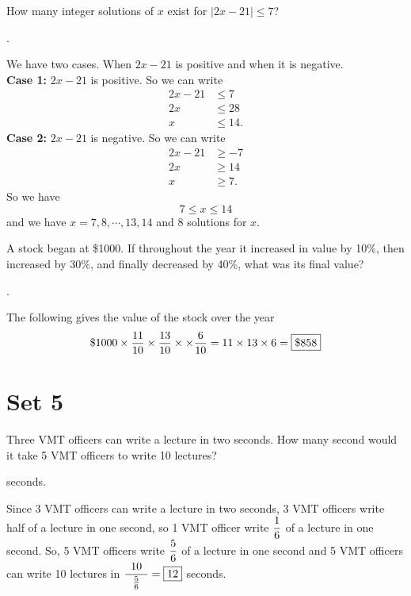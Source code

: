 \documentclass[11pt]{article}
\DeclareRobustCommand{\frac}[3][0pt]{%
  {\begingroup\hspace{#1}#2\hspace{#1}\endgroup\over\hspace{#1}#3\hspace{#1}}}
\begin{document}
\begin{problem}
How many integer solutions of $x$ exist for $\left| 2x-21 \right| \leq 7$?
\end{problem}
\begin{answer}
.
\end{answer}
\begin{solution}
We have two cases. When $2x-21$ is positive and when it is negative. \\
\textbf{Case 1:} $2x-21$ is positive.
So we can write
\begin{align*}
2x-21 &\leq 7 \\
2x &\leq 28 \\
x &\leq 14.
\end{align*}
\textbf{Case 2:} $2x-21$ is negative.
So we can write
\begin{align*}
2x-21 &\geq -7 \\
2x &\geq 14 \\
x &\geq 7.
\end{align*}
So we have
$$7 \leq x \leq 14$$
and we have $x = 7, 8, \cdots, 13, 14$ and $\boxed{8}$ solutions for $x$.
\end{solution}

\begin{problem}
A stock began at \$1000. If throughout the year it increased in value by 10\%, then increased by 30\%,
and finally decreased by 40\%, what was its final value?
\end{problem}
\begin{answer}
. 
\end{answer}
\begin{solution}
The following gives the value of the stock over the year
$$ \$1000 \times \frac{11}{10} \times \frac{13}{10} \times \times \frac{6}{10} = 11 \times 13 \times 6 = \boxed{\$858}$$
\end{solution}

\eject

\section*{Set 5}

\begin{problem}Three VMT officers can write a lecture in two seconds. How many second would it take 5 VMT officers to write 10 lectures?
\end{problem}

\begin{answer}  seconds. \end{answer}
\begin{solution}
Since 3 VMT officers can write a lecture in two seconds, 3 VMT officers write half of a lecture in one second, so 1 VMT officer write $\displaystyle \frac{1}{6}$ of a lecture in one second. So, 5 VMT officers write $\displaystyle \frac{5}{6}$ of a lecture in one second and 5 VMT officers can write 10 lectures in $\displaystyle \frac[5pt]{10}{\frac{5}{6}} = \boxed{12}$ seconds.
\end{solution}
\end{document}
